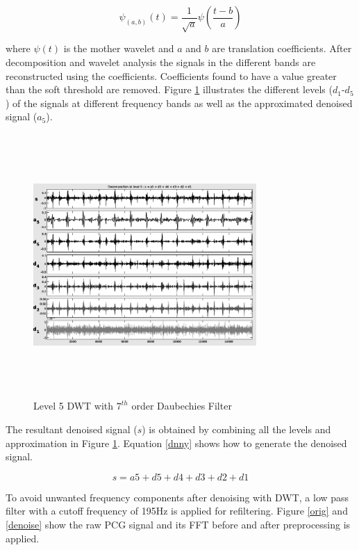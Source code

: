 \documentclass[10pt,twocolumn]{witseiepaper}
\begin{document}
\begin{equation}
    \psi_{(a,b)}(t) = \frac{1}{\sqrt{a}}\psi(\frac{t-b}{a})
    \label{mother}
\end{equation}

where \(\psi(t)\) is the mother wavelet and \(a\) and \(b\) are translation coefficients.
After decomposition and wavelet analysis the signals in the different bands are reconstructed using the coefficients. Coefficients found to have a value greater than the soft threshold are removed. Figure \ref{wavelet} illustrates the different levels ($d_{1}$-$d_{5}$) of the signals at different frequency bands as well as the approximated denoised signal ($a_{5}$). 

\begin{figure}[h!]
    \centering
    \includegraphics[width=8.5cm, height=10cm]{wavelet2.png}
    \caption{Level 5 DWT with $7^{th}$ order Daubechies Filter}
    \label{wavelet}
\end{figure}

The resultant denoised signal ($s$) is obtained by combining all the levels and approximation in Figure \ref{wavelet}. Equation \ref{dnny} shows how to generate the denoised signal.

\begin{equation}
 s = a5 + d5+d4+d3+d2+d1
 \label{dnny}
\end{equation}


To avoid unwanted frequency components after denoising with DWT, a low pass filter with a cutoff frequency of 195Hz is applied for refiltering.  Figure \ref{orig} and \ref{denoise} show the raw PCG signal and its FFT before and after preprocessing is applied.
\end{document}
